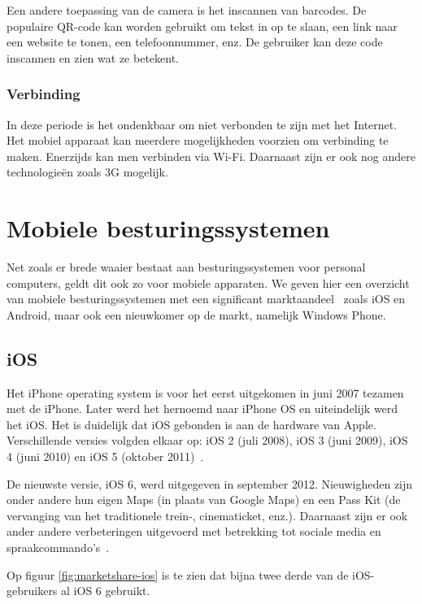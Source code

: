 Een andere toepassing van de camera is het inscannen van barcodes. De populaire QR-code kan worden gebruikt om tekst in op te slaan, een link naar een website te tonen, een telefoonnummer, enz. De gebruiker kan deze code inscannen en zien wat ze betekent.

\subsubsection{Verbinding}
In deze periode is het ondenkbaar om niet verbonden te zijn met het Internet. Het mobiel apparaat kan meerdere mogelijkheden voorzien om verbinding te maken. Enerzijds kan men verbinden via Wi-Fi. Daarnaast zijn er ook nog andere technologieën zoals 3G mogelijk.


\section{Mobiele besturingssystemen}
\label{sec:mobiele-besturingssystemen}
Net zoals er brede waaier bestaat aan besturingssystemen voor personal computers, geldt dit ook zo voor mobiele apparaten. We geven hier een overzicht van mobiele besturingssystemen met een significant marktaandeel~\cite{David2011, Hales2012} zoals iOS en Android, maar ook een nieuwkomer op de markt, namelijk Windows Phone.

\subsection{iOS}
Het iPhone operating system is voor het eerst uitgekomen in juni 2007 tezamen met de iPhone. Later werd het hernoemd naar iPhone OS en uiteindelijk werd het iOS. Het is duidelijk dat iOS gebonden is aan de hardware van Apple. Verschillende versies volgden elkaar op: iOS 2 (juli 2008), iOS 3 (juni 2009), iOS 4 (juni 2010) en iOS 5 (oktober 2011)~\cite{Deitel2012, PhilDutson2012}. 

De nieuwste versie, iOS 6, werd uitgegeven in september 2012. Nieuwigheden zijn onder andere hun eigen Maps (in plaats van Google Maps) en een Pass Kit (de vervanging van het traditionele trein-, cinematicket, enz.). Daarnaast zijn er ook ander andere verbeteringen uitgevoerd met betrekking tot sociale media en spraakcommando's~\cite{Deitel2012}.

Op figuur \ref{fig:marketshare-ios} is te zien dat bijna twee derde van de iOS-gebruikers al iOS 6 gebruikt.


